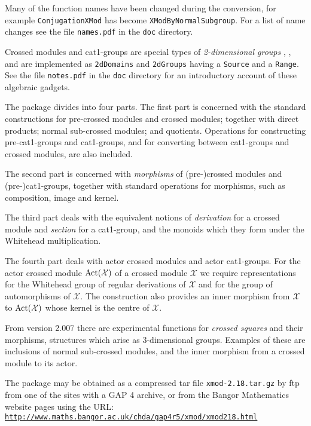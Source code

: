\documentclass[a4paper,11pt]{report}
\begin{document}
{ Many of the function names have been changed during the conversion, for
example \texttt{ConjugationXMod} has become \texttt{XModByNormalSubgroup}. For a list of name changes see the file \texttt{names.pdf} in the \texttt{doc} directory. 

 Crossed modules and cat1-groups are special types of \emph{2-dimensional groups} \cite{B82}, \cite{brow:hig:siv}, and are implemented as \texttt{2dDomains} and \texttt{2dGroups} having a \texttt{Source} and a \texttt{Range}. See the file \texttt{notes.pdf} in the \texttt{doc} directory for an introductory account of these algebraic gadgets. 

 The package divides into four parts. The first part is concerned with the
standard constructions for pre-crossed modules and crossed modules; together
with direct products; normal sub-crossed modules; and quotients. Operations
for constructing pre-cat1-groups and cat1-groups, and for converting between
cat1-groups and crossed modules, are also included. 

 The second part is concerned with \emph{morphisms} of (pre-)crossed modules and (pre-)cat1-groups, together with standard
operations for morphisms, such as composition, image and kernel. 

 The third part deals with the equivalent notions of \emph{derivation} for a crossed module and \emph{section} for a cat1-group, and the monoids which they form under the Whitehead
multiplication. 

 The fourth part deals with actor crossed modules and actor cat1-groups. For
the actor crossed module ${\rm Act}(\mathcal{X})$ of a crossed module $\mathcal{X}$ we require representations for the Whitehead group of regular derivations of $\mathcal{X}$ and for the group of automorphisms of $\mathcal{X}$. The construction also provides an inner morphism from $\mathcal{X}$ to ${\rm Act}(\mathcal{X})$ whose kernel is the centre of $\mathcal{X}$. 

 From version 2.007 there are experimental functions for \emph{crossed squares} and their morphisms, structures which arise as $3$-dimensional groups. Examples of these are inclusions of normal sub-crossed
modules, and the inner morphism from a crossed module to its actor. 

 The package may be obtained as a compressed tar file \texttt{xmod-2.18.tar.gz} by ftp from one of the sites with a \textsf{GAP} 4 archive, or from the Bangor Mathematics website pages using the URL: \href{http://www.maths.bangor.ac.uk/chda/gap4r5/xmod/xmod218.html} {\texttt{http://www.maths.bangor.ac.uk/chda/gap4r5/xmod/xmod218.html}} 

}
\end{document}
